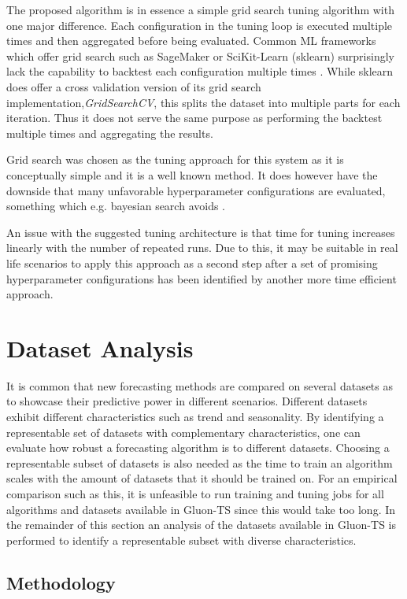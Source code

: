 The proposed algorithm is in essence a simple grid search tuning algorithm with one major difference. Each configuration in the tuning loop is executed multiple times and then aggregated before being evaluated. Common ML frameworks which offer grid search such as SageMaker or SciKit-Learn (sklearn) surprisingly lack the capability to backtest each configuration multiple times \cite{sagemaker_website, scikit-learn}. While sklearn does offer a cross validation version of its grid search implementation,\textit{GridSearchCV}, this splits the dataset into multiple parts for each iteration. Thus it does not serve the same purpose as performing the backtest multiple times and aggregating the results.

Grid search was chosen as the tuning approach for this system as it is conceptually simple and it is a well known method. It does however have the downside that many unfavorable hyperparameter configurations are evaluated, something which e.g. bayesian search avoids \cite{snoek2012practical}.

An issue with the suggested tuning architecture is that time for tuning increases linearly with the number of repeated runs. Due to this, it may be suitable in real life scenarios to apply this approach as a second step after a set of promising hyperparameter configurations has been identified by another more time efficient approach.

\section{Dataset Analysis}
\label{sec:dataset_analysis}
It is common that new forecasting methods are compared on several datasets as to showcase their predictive power in different scenarios. Different datasets exhibit different characteristics such as trend and seasonality. By identifying a representable set of datasets with complementary characteristics, one can evaluate how robust a forecasting algorithm is to different datasets. Choosing a representable subset of datasets is also needed as the time to train an algorithm scales with the amount of datasets that it should be trained on. For an empirical comparison such as this, it is unfeasible to run training and tuning jobs for all algorithms and datasets available in Gluon-TS since this would take too long. In the remainder of this section an analysis of the datasets available in Gluon-TS is performed to identify a representable subset with diverse characteristics.

\subsection{Methodology}


